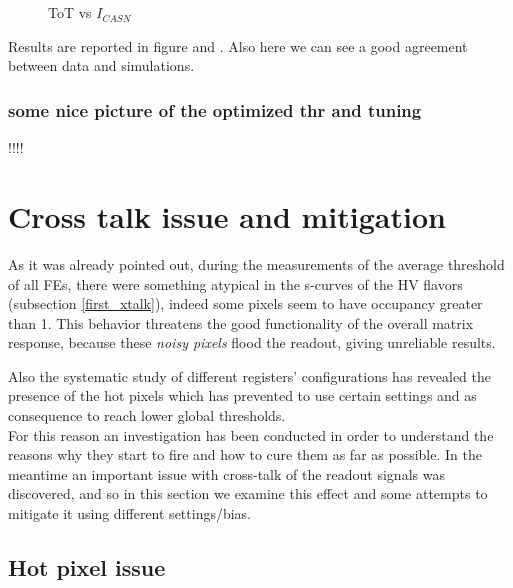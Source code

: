 \begin{figure}[h!]
\centering
{}\\%
{}\\
\caption{ToT vs $I_{CASN}$}
\label{fig:tot_vs_icasn}
\end{figure}

Results are reported in figure  and . Also here we can see a good agreement between data and simulations.

\subsubsection{some nice picture of the optimized thr and tuning}

!!!!


\section{Cross talk issue and mitigation} \label{xtalk}

As it was already pointed out, during the measurements of the average threshold of all FEs, there were something atypical in the s-curves of the HV flavors (subsection \vref{first_xtalk}), indeed some pixels seem to have occupancy greater than 1. This behavior threatens the good functionality of the overall matrix response, because these \textit{noisy pixels} flood the readout, giving unreliable results.

Also the systematic study of different registers' configurations has revealed the presence of the hot pixels which has prevented to use certain settings and as consequence to reach lower global thresholds. \\

For this reason an investigation has been conducted in order to understand the reasons why they start to fire and how to cure them as far as possible.
In the meantime an important issue with cross-talk of the readout signals was discovered, and so in this section we examine this effect and some attempts to mitigate it using different settings/bias.


\subsection{Hot pixel issue}

